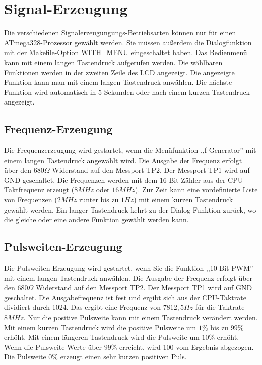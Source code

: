 \chapter{Signal-Erzeugung}

Die verschiedenen Signalerzeugungungs-Betriebsarten können nur für einen ATmega328-Prozessor
gewählt werden.
Sie müssen außerdem die Dialogfunktion mit der Makefile-Option WITH\_MENU eingeschaltet haben.
Das Bedienmenü kann mit einem langen Tastendruck aufgerufen werden.
Die wählbaren Funktionen werden in der zweiten Zeile des LCD angezeigt.
Die angezeigte Funktion kann man mit einem langen Tastendruck anwählen.
Die nächste Funktion wird automatisch in 5 Sekunden oder nach einem kurzen Tastendruck
angezeigt.

\label{sec:generation}

\section{Frequenz-Erzeugung}
Die Frequenzerzeugung wird gestartet, wenn die Menüfunktion ,,f-Generator'' mit einem
langen Tastendruck angewählt wird.
Die Ausgabe der Frequenz erfolgt über den \(680\Omega\) Widerstand auf den Messport TP2.
Der Messport TP1 wird auf GND geschaltet.
Die Frequenzen werden mit dem 16-Bit Zähler aus der CPU-Taktfrequenz erzeugt (\(8MHz\) oder \(16MHz\)).
Zur Zeit kann eine vordefinierte Liste von Frequenzen (\(2MHz\) runter bis zu \(1Hz\)) mit einem kurzen
Tastendruck gewählt werden. Ein langer Tastendruck kehrt zu der Dialog-Funktion zurück,
wo die gleiche oder eine andere Funktion gewählt werden kann.

\section{Pulsweiten-Erzeugung}
Die Pulsweiten-Erzeugung wird gestartet, wenn Sie die Funktion ,,10-Bit PWM'' mit einem
langen Tastendruck anwählen.
Die Ausgabe der Frequenz erfolgt über den \(680\Omega\) Widerstand auf den Messport TP2.
Der Messport TP1 wird auf GND geschaltet.
Die Ausgabefrequenz ist fest und ergibt sich aus der CPU-Taktrate dividiert durch 1024.
Das ergibt eine Frequenz von \(7812,5Hz\) für die Taktrate \(8MHz\).
Nur die positive Pulsweite kann mit einem Tastendruck verändert werden. Mit einem
kurzen Tastendruck wird die positive Pulsweite um \(1\%\) bis zu \(99\%\) erhöht.
Mit einem längeren Tastendruck wird die Pulsweite um \(10\%\) erhöht.
Wenn die Pulsweite Werte über \(99\%\) erreicht, wird 100 vom Ergebnis abgezogen.
Die Pulsweite \(0\%\) erzeugt einen sehr kurzen positiven Puls.

